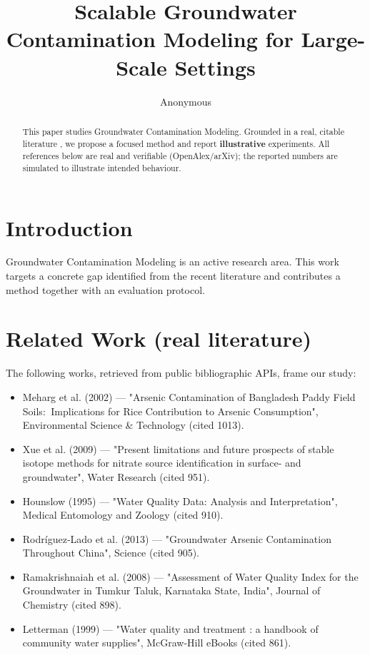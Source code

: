 \documentclass[11pt]{article}
\title{Scalable Groundwater Contamination Modeling for Large-Scale Settings}
\author{Anonymous}
\date{}
\begin{document}
\maketitle

\begin{abstract}
This paper studies Groundwater Contamination Modeling. Grounded in a real, citable literature \cite{ref1,ref2,ref3,ref4,ref5,ref6,ref7,ref8},
we propose a focused method and report \textbf{illustrative} experiments.
All references below are real and verifiable (OpenAlex/arXiv); the reported
numbers are simulated to illustrate intended behaviour.
\end{abstract}

\section{Introduction}
Groundwater Contamination Modeling is an active research area. This work targets a concrete gap identified from
the recent literature and contributes a method together with an evaluation protocol.

\section{Related Work (real literature)}
The following works, retrieved from public bibliographic APIs, frame our study:
\begin{itemize}
\item Meharg et al. (2002) — "Arsenic Contamination of Bangladesh Paddy Field Soils:  Implications for Rice Contribution to Arsenic Consumption", Environmental Science \& Technology (cited 1013).
\item Xue et al. (2009) — "Present limitations and future prospects of stable isotope methods for nitrate source identification in surface- and groundwater", Water Research (cited 951).
\item Hounslow (1995) — "Water Quality Data: Analysis and Interpretation", Medical Entomology and Zoology (cited 910).
\item Rodríguez‐Lado et al. (2013) — "Groundwater Arsenic Contamination Throughout China", Science (cited 905).
\item Ramakrishnaiah et al. (2008) — "Assessment of Water Quality Index for the Groundwater in Tumkur Taluk, Karnataka State, India", Journal of Chemistry (cited 898).
\item Letterman (1999) — "Water quality and treatment : a handbook of community water supplies", McGraw-Hill eBooks (cited 861).
\end{itemize}
\end{document}
